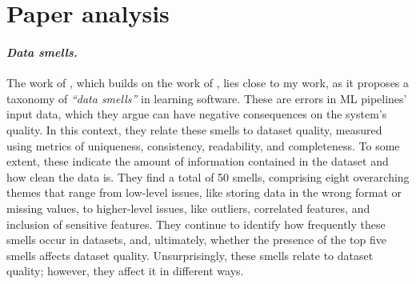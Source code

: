 \section*{Paper analysis}
    

    \paragraph{\textit{Data smells.}} The work of \citet{recupito2024unmasking}, which builds on the work of \citet{foidl2022data}, lies close to my work, as it proposes a taxonomy of \textit{``data smells''} in learning software.
    These are errors in ML pipelines' input data, which they argue can have negative consequences on the system's quality.
    In this context, they relate these smells to dataset quality, measured using metrics of uniqueness, consistency, readability, and completeness.
    To some extent, these indicate the amount of information contained in the dataset and how clean the data is.
    They find a total of 50 smells, comprising eight overarching themes that range from low-level issues, like storing data in the wrong format or missing values, to higher-level issues, like outliers, correlated features, and inclusion of sensitive features.
    They continue to identify how frequently these smells occur in datasets, and, ultimately, whether the presence of the top five smells affects dataset quality.
    Unsurprisingly, these smells relate to dataset quality; however, they affect it in different ways.
    
